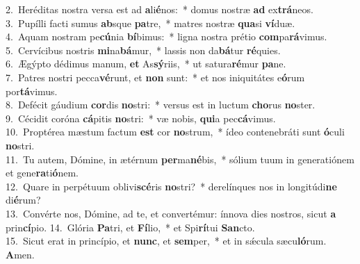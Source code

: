 {2.~}Heréditas nostra versa est ad \textbf{a}li\textbf{é}nos:~* domus nostræ \textbf{ad} ex\textbf{trá}neos.\\
{3.~}Pupílli facti sumus \textbf{ab}sque \textbf{pa}tre,~* matres nostræ \textbf{qua}si \textbf{ví}duæ.\\
{4.~}Aquam nostram pe\textbf{cú}nia \textbf{bí}bimus:~* ligna nostra prétio \textbf{com}pa\textbf{rá}vimus.\\
{5.~}Cervícibus nostris \textbf{mi}na\textbf{bá}mur,~* lassis non da\textbf{bá}tur \textbf{ré}quies.\\
{6.~}Ægýpto dédimus manum, \textbf{et} As\textbf{sý}riis,~* ut satura\textbf{ré}mur \textbf{pa}ne.\\
{7.~}Patres nostri pecca\textbf{vé}runt, et \textbf{non} sunt:~* et nos iniquitátes e\textbf{ó}rum por\textbf{tá}vimus.\\
{8.~}Defécit gáudium \textbf{cor}dis \textbf{no}stri:~* versus est in luctum \textbf{cho}rus \textbf{no}ster.\\
{9.~}Cécidit coróna \textbf{cá}pitis \textbf{no}stri:~* væ nobis, \textbf{qui}a pec\textbf{cá}vimus.\\
{10.~}Proptérea mæstum factum \textbf{est} cor \textbf{no}strum,~* ídeo contenebráti sunt \textbf{ó}culi \textbf{no}stri.\\
{11.~}Tu autem, Dómine, in ætérnum \textbf{per}ma\textbf{né}bis,~* sólium tuum in generatiónem et gene\textbf{ra}ti\textbf{ó}nem.\\
{12.~}Quare in perpétuum oblivi\textbf{scé}ris \textbf{no}stri?~* derelínques nos in longitúdi\textbf{ne} di\textbf{é}rum?\\
{13.~}Convérte nos, Dómine, ad te, et convertémur: ínnova dies nostros, sicut \textbf{a} prin\textbf{cí}pio.
{14.~}Glória \textbf{Pa}tri, et \textbf{Fí}lio,~* et Spi\textbf{rí}tui \textbf{San}cto.\\
{15.~}Sicut erat in princípio, et \textbf{nunc}, et \textbf{sem}per,~* et in sǽcula sæcu\textbf{ló}rum. \textbf{A}men.\\
